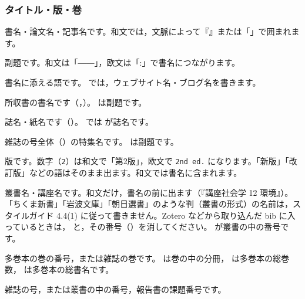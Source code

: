 \subsubsection{タイトル・版・巻}
\begin{fieldlist}

書名・論文名・記事名です。和文では，文脈によって『』または「」で囲まれます。


副題です。和文は「――」，欧文は「:」で書名につながります。


書名に添える語です。 では，ウェブサイト名・ブログ名を書きます。


所収書の書名です（，）。 は副題です。


誌名・紙名です（）。 では  が誌名です。


雑誌の号全体（）の特集名です。 は副題です。


版です。数字（\texttt{2}）は和文で「第2版」，欧文で \texttt{2nd ed.} になります。「新版」「改訂版」などの語はそのまま出ます。和文では書名に含まれます。


叢書名・講座名です。和文だけ，書名の前に出ます（『講座社会学 12 環境』）。「ちくま新書」「岩波文庫」「朝日選書」のような判（叢書の形式）の名前は，スタイルガイド 4.4(1) に従って書きません。Zotero などから取り込んだ bib に入っているときは， と，その番号（）を消してください。 が叢書の中の番号です。


多巻本の巻の番号，または雑誌の巻です。 は巻の中の分冊， は多巻本の総巻数， は多巻本の総書名です。


雑誌の号，または叢書の中の番号，報告書の課題番号です。
\end{fieldlist}

